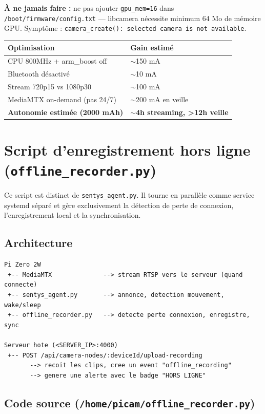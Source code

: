 \documentclass[12pt,a4paper]{article}
\begin{document}
\textbf{À ne jamais faire :} ne pas ajouter \texttt{gpu\_mem=16} dans
\texttt{/boot/firmware/config.txt} — libcamera nécessite minimum 64 Mo de mémoire GPU.
Symptôme : \texttt{camera\_create(): selected camera is not available}.

\begin{longtable}{|l|l|}
\hline
\textbf{Optimisation} & \textbf{Gain estimé} \\
\hline
\endhead
\hline
\endfoot
CPU 800MHz + arm\_boost off & $\sim$150 mA \\
Bluetooth désactivé & $\sim$10 mA \\
Stream 720p15 vs 1080p30 & $\sim$100 mA \\
MediaMTX on-demand (pas 24/7) & $\sim$200 mA en veille \\
\hline
\textbf{Autonomie estimée (2000 mAh)} & \textbf{$\sim$4h streaming, >12h veille} \\
\hline
\end{longtable}

\section{Script d'enregistrement hors ligne (\texttt{offline\_recorder.py})}

Ce script est distinct de \texttt{sentys\_agent.py}. Il tourne en parallèle comme
service systemd séparé et gère exclusivement la détection de perte de connexion,
l'enregistrement local et la synchronisation.

\subsection{Architecture}

\begin{lstlisting}
Pi Zero 2W
 +-- MediaMTX              --> stream RTSP vers le serveur (quand connecte)
 +-- sentys_agent.py       --> annonce, detection mouvement, wake/sleep
 +-- offline_recorder.py   --> detecte perte connexion, enregistre, sync

Serveur hote (<SERVER_IP>:4000)
 +-- POST /api/camera-nodes/:deviceId/upload-recording
       --> recoit les clips, cree un event "offline_recording"
       --> genere une alerte avec le badge "HORS LIGNE"
\end{lstlisting}

\subsection{Code source (\texttt{/home/picam/offline\_recorder.py})}
\end{document}
